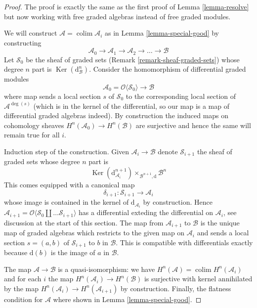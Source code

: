 \documentclass{stacks-project}
\theoremstyle{plain}
\theoremstyle{definition}
\theoremstyle{remark}
\numberwithin{equation}{subsection}
\def\colim{\mathop{\mathrm{colim}}\nolimits}
\def\Ker{\mathop{\mathrm{Ker}}}
\begin{document}
\begin{proof}
The proof is exactly the same as the first proof of
Lemma \ref{lemma-resolve} but now working with free graded
algebras instead of free graded modules.

\medskip\noindent
We will construct $\mathcal{A} = \colim \mathcal{A}_i$ as in
Lemma \ref{lemma-special-good} by constructing
$$
\mathcal{A}_0 \to \mathcal{A}_1 \to \mathcal{A}_2 \to \ldots \to \mathcal{B}
$$
Let $\mathcal{S}_0$ be the sheaf of graded sets
(Remark \ref{remark-sheaf-graded-sets})
whose degree $n$ part is $\Ker(\text{d}_\mathcal{B}^n)$.
Consider the homomorphism of differential
graded modules
$$
\mathcal{A}_0 = \mathcal{O}\langle \mathcal{S}_0 \rangle
\longrightarrow
\mathcal{B}
$$
where map sends a local section $s$ of $\mathcal{S}_0$
to the corresponding local section of $\mathcal{A}^{\deg(s)}$
(which is in the kernel of the differential, so our map is
a map of differential graded algebras indeed). By construction the
induced maps on cohomology sheaves $H^n(\mathcal{A}_0) \to H^n(\mathcal{B})$
are surjective and hence the same will remain true for all $i$.

\medskip\noindent
Induction step of the construction. Given $\mathcal{A}_i \to \mathcal{B}$
denote $\mathcal{S}_{i + 1}$ the sheaf of graded sets whose degree $n$ part is
$$
\Ker(\text{d}_{\mathcal{A}_i}^{n + 1})
\times_{\mathcal{B}^{n + 1}, \text{d}}
\mathcal{B}^n
$$
This comes equipped with a canonical map
$$
\delta_{i + 1} : \mathcal{S}_{i + 1} \longrightarrow
\mathcal{A}_i
$$
whose image is contained in the kernel of $\text{d}_{\mathcal{A}_i}$
by construction. Hence $\mathcal{A}_{i + 1} = \mathcal{O}\langle
\mathcal{S}_0 \amalg \ldots \mathcal{S}_{i + 1}\rangle$ has a differential
exteding the differential on $\mathcal{A}_i$, see discussion at the
start of this section. The map from $\mathcal{A}_{i + 1}$ to
$\mathcal{B}$ is the unique map of graded algebras which
restricts to the given map on $\mathcal{A}_i$ and sends
a local section $s = (a, b)$ of $\mathcal{S}_{i + 1}$
to $b$ in $\mathcal{B}$. This is compatible with differentials
exactly because $\text{d}(b)$ is the image of $a$ in $\mathcal{B}$.

\medskip\noindent
The map $\mathcal{A} \to \mathcal{B}$ is a quasi-isomorphism:
we have $H^n(\mathcal{A}) = \colim H^n(\mathcal{A}_i)$
and for each $i$ the map $H^n(\mathcal{A}_i) \to H^n(\mathcal{B})$
is surjective with kernel annihilated by the map
$H^n(\mathcal{A}_i) \to H^n(\mathcal{A}_{i + 1})$ by construction.
Finally, the flatness condition for $\mathcal{A}$ where shown in
Lemma \ref{lemma-special-good}.
\end{proof}
\end{document}
